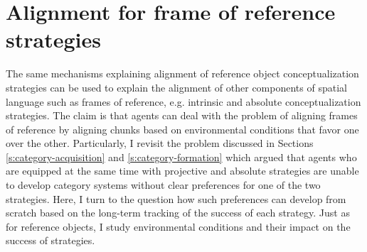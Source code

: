 %


\section{Alignment for frame of reference strategies}
The same mechanisms explaining alignment of reference object conceptualization strategies 
can be used to explain the alignment of
other components of spatial language such as frames of reference, e.g. intrinsic and absolute
conceptualization strategies. The claim is that agents can deal 
with the problem of aligning frames of reference by aligning chunks based on environmental 
conditions that favor one over the other. Particularly, I revisit the problem discussed
in Sections \ref{s:category-acquisition} and \ref{s:category-formation} which argued
that agents who are equipped at the same time with projective and absolute 
strategies are unable to develop category systems without clear preferences for one of the 
two strategies. Here, I turn to the question how such preferences can develop from
scratch based on the long-term tracking of the success of each strategy. 
Just as for reference objects, I study environmental conditions 
and their impact on the success of strategies. 


